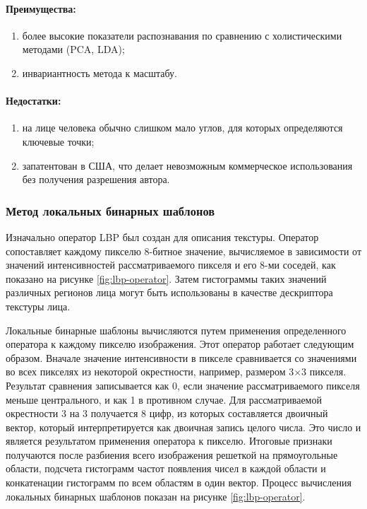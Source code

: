 \documentclass[a4paper,12pt]{report}
\numberwithin{equation}{section}
\begin{document}
\paragraph{Преимущества:}
\begin{enumerate}
\item более высокие показатели распознавания по сравнению с холистическими
методами (PCA, LDA);
\item инвариантность метода к масштабу.
\end{enumerate}

\paragraph{Недостатки:}
\begin{enumerate}
\item на лице человека обычно слишком мало углов, для которых определяются
ключевые точки;
\item запатентован в США, что делает невозможным коммерческое использования без
получения разрешения автора.
\end{enumerate}

\subsubsection{Метод локальных бинарных шаблонов} 
Изначально оператор LBP \cite{LBP} был создан для описания текстуры. Оператор
сопоставляет каждому пикселю 8-битное значение, вычисляемое в зависимости от
значений интенсивностей рассматриваемого пикселя и его 8-ми соседей, как
показано на рисунке \ref{fig:lbp-operator}. Затем гистограммы таких значений
различных регионов лица могут быть использованы в качестве дескриптора текстуры
лица.


Локальные бинарные шаблоны вычисляются путем применения определенного оператора
к каждому пикселю изображения. Этот оператор работает следующим образом. Вначале
значение интенсивности в пикселе сравнивается со значениями во всех пикселях из
некоторой окрестности, например, размером 3×3 пикселя. Результат сравнения
записывается как 0, если значение рассматриваемого пикселя меньше центрального,
и как 1 в противном случае. Для рассматриваемой окрестности 3 на 3 получается 8
цифр, из которых составляется двоичный вектор, который интерпретируется как
двоичная запись целого числа. Это число и является результатом применения
оператора к пикселю. Итоговые признаки получаются после разбиения всего
изображения решеткой на прямоугольные области, подсчета гистограмм частот
появления чисел в каждой области и конкатенации гистограмм по всем областям в
один вектор. Процесс вычисления локальных бинарных шаблонов показан на рисунке
\ref{fig:lbp-operator}.
\end{document}
